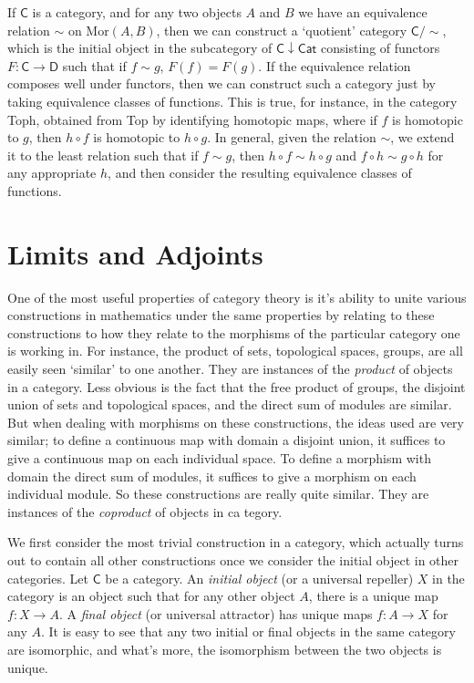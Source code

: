 If $\mathsf{C}$ is a category, and for any two objects $A$ and $B$ we have an equivalence relation $\sim$ on $\text{Mor}(A,B)$, then we can construct a `quotient' category $\mathsf{C}/\sim$, which is the initial object in the subcategory of $\mathsf{C} \downarrow \mathsf{Cat}$ consisting of functors $F: \mathsf{C} \to \mathsf{D}$ such that if $f \sim g$, $F(f) = F(g)$. If the equivalence relation composes well under functors, then we can construct such a category just by taking equivalence classes of functions. This is true, for instance, in the category {\sf Toph}, obtained from {\sf Top} by identifying homotopic maps, where if $f$ is homotopic to $g$, then $h \circ f$ is homotopic to $h \circ g$. In general, given the relation $\sim$, we extend it to the least relation such that if $f \sim g$, then $h \circ f \sim h \circ g$ and $f \circ h \sim g \circ h$ for any appropriate $h$, and then consider the resulting equivalence classes of functions.


\chapter{Limits and Adjoints}

One of the most useful properties of category theory is it's ability to unite various constructions in mathematics under the same properties by relating to these constructions to how they relate to the morphisms of the particular category one is working in. For instance, the product of sets, topological spaces, groups, are all easily seen `similar' to one another. They are instances of the \emph{product} of objects in a category. Less obvious is the fact that the free product of groups, the disjoint union of sets and topological spaces, and the direct sum of modules are similar. But when dealing with morphisms on these constructions, the ideas used are very similar; to define a continuous map with domain a disjoint union, it suffices to give a continuous map on each individual space. To define a morphism with domain the direct sum of modules, it suffices to give a morphism on each individual module. So these constructions are really quite similar. They are instances of the \emph{coproduct} of objects in ca tegory.

We first consider the most trivial construction in a category, which actually turns out to contain all other constructions once we consider the initial object in other categories. Let $\mathsf{C}$ be a category. An \emph{initial object} (or a universal repeller) $X$ in the category is an object such that for any other object $A$, there is a unique map $f: X \to A$. A \emph{final object} (or universal attractor) has unique maps $f: A \to X$ for any $A$. It is easy to see that any two initial or final objects in the same category are isomorphic, and what's more, the isomorphism between the two objects is unique.

